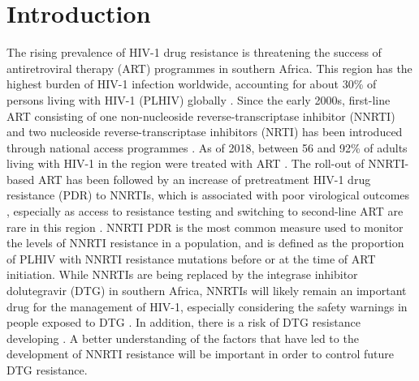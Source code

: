\documentclass{article}
\begin{document}
\section{Introduction}

The rising prevalence of HIV-1 drug resistance is threatening the success of antiretroviral therapy (ART) programmes in southern Africa.
This region has the highest burden of HIV-1 infection worldwide, accounting for about 30\% of persons living with HIV-1 (PLHIV) globally \cite{wang2016estimates}.
Since the early 2000s, first-line ART consisting of one non-nucleoside reverse-transcriptase inhibitor (NNRTI) and two nucleoside reverse-transcriptase inhibitors (NRTI) has been introduced through national access programmes \cite{whoreco}.
As of 2018, between 56 and 92\%  of adults living with HIV-1 in the region were treated with ART \cite{unaidsreport2019}. 
The roll-out of NNRTI-based ART has been followed by an increase of pretreatment HIV-1 drug resistance (PDR) to NNRTIs, which is associated with poor virological outcomes \cite{wittkop2011effect,hamers2012effect,avila2016pretreatment}, especially as access to resistance testing and switching to second-line ART are rare in this region \cite{haas2015monitoring}.
NNRTI PDR is the most common measure used to monitor the levels of NNRTI resistance in a population, and is defined as the proportion of PLHIV with NNRTI resistance mutations before or at the time of ART initiation. 
While NNRTIs are being replaced by the integrase inhibitor dolutegravir (DTG) in southern Africa, NNRTIs will likely remain an important drug for the management of HIV-1, especially considering the safety warnings in people exposed to DTG \cite{zash2018neural,norwood2017weight}.
In addition, there is a risk of DTG resistance developing \cite{rhee2019systematic}.
A better understanding of the factors that have led to the development of NNRTI resistance will be important in order to control future DTG resistance.
\end{document}
